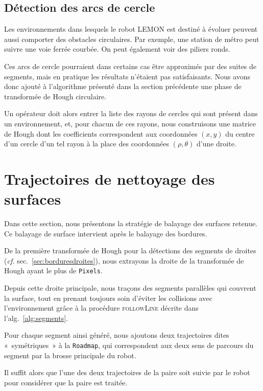 \documentclass[french,A4paper,]{book}
\begin{document}
\subsection{Détection des arcs de cercle}\label{sec:bordurescourbes}

Les environnements dans lesquels le robot LEMON est destiné à évoluer
peuvent aussi comporter des obstacles circulaires. Par exemple, une
station de métro peut suivre une voie ferrée courbée. On peut également
voir des piliers ronds.

Ces arcs de cercle pourraient dans certains cas être approximés par des
suites de segments, mais en pratique les résultats n'étaient pas
satisfaisants. Nous avons donc ajouté à l'algorithme présenté dans la
section précédente une phase de transformée de Hough circulaire.

Un opérateur doit alors entrer la liste des rayons de cercles qui sont
présent dans un environnement, et, pour chacun de ces rayons, nous
construisons une matrice de Hough dont les coefficients correspondent
aux coordonnées \((x, y)\) du centre d'un cercle d'un tel rayon à la
place des coordonnées \((\rho, \theta)\) d'une droite.

\section{Trajectoires de nettoyage des surfaces}\label{sec:surfaces}

Dans cette section, nous présentons la stratégie de balayage des
surfaces retenue. Ce balayage de surface intervient après le balayage
des bordures.

De la première transformée de Hough pour la détections des segments de
droites (\emph{cf.} sec.~\ref{sec:borduresdroites}), nous extrayons la
droite de la transformée de Hough ayant le plus de \texttt{Pixels}.

Depuis cette droite principale, nous traçons des segments parallèles qui
couvrent la surface, tout en prenant toujours soin d'éviter les
collisions avec l'environnement grâce à la procédure \textsc{followLine}
décrite dans l'alg.~\ref{alg:segments}.

Pour chaque segment ainsi généré, nous ajoutons deux trajectoires dites
«~symétriques~» à la \texttt{Roadmap}, qui correspondent aux deux sens
de parcours du segment par la brosse principale du robot.

Il suffit alors que l'une des deux trajectoires de la paire soit suivie
par le robot pour considérer que la paire est traitée.
\end{document}
